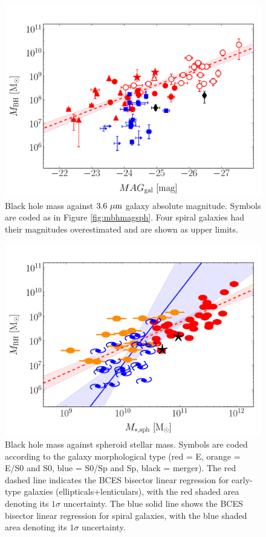 \documentclass[preprint2]{emulateapj}
\begin{document}
\begin{figure}[h]
\begin{center}
\includegraphics[width=\columnwidth]{images/mbh_vs_mag_tot.pdf}
\caption{Black hole mass against $3.6\rm~\mu m$ galaxy absolute magnitude. 
Symbols are coded as in Figure \ref{fig:mbhmagsph}.
Four spiral galaxies had their magnitudes overestimated and are shown as upper limits. 
}
\label{fig:mbhmaggal}
\end{center}
\end{figure}



\begin{figure}[h]
\begin{center}
\includegraphics[width=\columnwidth]{images/mbh_vs_mass_sph.pdf}
\caption{Black hole mass against spheroid stellar mass. 
Symbols are coded according to the galaxy morphological type (red = E, orange = E/S0 and S0, blue = S0/Sp and Sp, black = merger).
The red dashed line indicates the BCES bisector linear regression for early-type galaxies (ellipticals+lenticulars), 
with the red shaded area denoting its $1\sigma$ uncertainty. 
The blue solid line shows the BCES bisector linear regression for spiral galaxies, 
with the blue shaded area denoting its $1\sigma$ uncertainty. }
\label{fig:mbhmasssph}
\end{center}
\end{figure}
\end{document}
